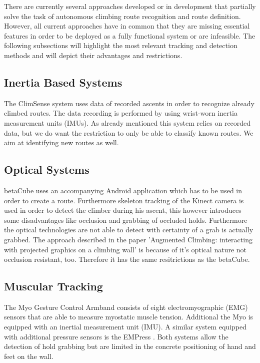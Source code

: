 There are currently several approaches developed or in development that partially solve the task of autonomous climbing route recognition and route definition.
However, all current approaches have in common that they are missing essential features in order to be deployed as a fully functional system or are infeasible. 
The following subsections will highlight the most relevant tracking and detection methods and will depict their advantages and restrictions. 

\subsection{Inertia Based Systems}
The ClimSense system \cite{pub7648, Kosmalla:2015:CAC:2702123.2702311} uses data of recorded ascents in order to recognize already climbed routes. 
The data recording is performed by using wrist-worn inertia measurement units (IMUs).
As already mentioned this system relies on recorded data, but we do want the restriction to only be able to classify known routes. We aim at identifying new routes as well. 

\subsection{Optical Systems}
betaCube \cite{pub8245, Wiehr:2016:BET:2851581.2892393} uses an accompanying Android application which has to be used in order to create a route. 
Furthermore skeleton tracking of the Kinect camera is used in order to detect the climber during his ascent, this however introduces some disadvantages like occlusion and grabbing of occluded holds. 
Furthermore the optical technologies are not able to detect with certainty of a grab is actually grabbed.
The approach described in the paper 'Augmented Climbing: interacting with projected graphics on a climbing wall' \cite{Kajastila:2014:ACI:2611780.2581139, Kajastila:2014:ACI:2559206.2581139} is because of it's optical nature not occlusion resistant, too. 
Therefore it has the same resitrictions as the betaCube.

\subsection{Muscular Tracking}
The Myo Gesture Control Armband \cite{Myo:Online} consists of eight electromyographic (EMG) sensors that are able to measure myostatic muscle tension. 
Additional the Myo is equipped with an inertial measurement unit (IMU). 
A similar system equipped with additional pressure sensors is the EMPress \cite{McIntosh:2016:EPH:2858036.2858093}. 
Both systems allow the detection of hold grabbing but are limited in the concrete positioning of hand and feet on the wall.

